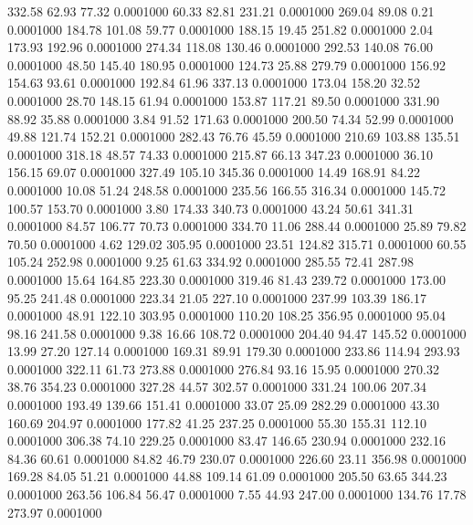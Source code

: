  332.58   62.93   77.32   0.0001000
  60.33   82.81  231.21   0.0001000
 269.04   89.08    0.21   0.0001000
 184.78  101.08   59.77   0.0001000
 188.15   19.45  251.82   0.0001000
   2.04  173.93  192.96   0.0001000
 274.34  118.08  130.46   0.0001000
 292.53  140.08   76.00   0.0001000
  48.50  145.40  180.95   0.0001000
 124.73   25.88  279.79   0.0001000
 156.92  154.63   93.61   0.0001000
 192.84   61.96  337.13   0.0001000
 173.04  158.20   32.52   0.0001000
  28.70  148.15   61.94   0.0001000
 153.87  117.21   89.50   0.0001000
 331.90   88.92   35.88   0.0001000
   3.84   91.52  171.63   0.0001000
 200.50   74.34   52.99   0.0001000
  49.88  121.74  152.21   0.0001000
 282.43   76.76   45.59   0.0001000
 210.69  103.88  135.51   0.0001000
 318.18   48.57   74.33   0.0001000
 215.87   66.13  347.23   0.0001000
  36.10  156.15   69.07   0.0001000
 327.49  105.10  345.36   0.0001000
  14.49  168.91   84.22   0.0001000
  10.08   51.24  248.58   0.0001000
 235.56  166.55  316.34   0.0001000
 145.72  100.57  153.70   0.0001000
   3.80  174.33  340.73   0.0001000
  43.24   50.61  341.31   0.0001000
  84.57  106.77   70.73   0.0001000
 334.70   11.06  288.44   0.0001000
  25.89   79.82   70.50   0.0001000
   4.62  129.02  305.95   0.0001000
  23.51  124.82  315.71   0.0001000
  60.55  105.24  252.98   0.0001000
   9.25   61.63  334.92   0.0001000
 285.55   72.41  287.98   0.0001000
  15.64  164.85  223.30   0.0001000
 319.46   81.43  239.72   0.0001000
 173.00   95.25  241.48   0.0001000
 223.34   21.05  227.10   0.0001000
 237.99  103.39  186.17   0.0001000
  48.91  122.10  303.95   0.0001000
 110.20  108.25  356.95   0.0001000
  95.04   98.16  241.58   0.0001000
   9.38   16.66  108.72   0.0001000
 204.40   94.47  145.52   0.0001000
  13.99   27.20  127.14   0.0001000
 169.31   89.91  179.30   0.0001000
 233.86  114.94  293.93   0.0001000
 322.11   61.73  273.88   0.0001000
 276.84   93.16   15.95   0.0001000
 270.32   38.76  354.23   0.0001000
 327.28   44.57  302.57   0.0001000
 331.24  100.06  207.34   0.0001000
 193.49  139.66  151.41   0.0001000
  33.07   25.09  282.29   0.0001000
  43.30  160.69  204.97   0.0001000
 177.82   41.25  237.25   0.0001000
  55.30  155.31  112.10   0.0001000
 306.38   74.10  229.25   0.0001000
  83.47  146.65  230.94   0.0001000
 232.16   84.36   60.61   0.0001000
  84.82   46.79  230.07   0.0001000
 226.60   23.11  356.98   0.0001000
 169.28   84.05   51.21   0.0001000
  44.88  109.14   61.09   0.0001000
 205.50   63.65  344.23   0.0001000
 263.56  106.84   56.47   0.0001000
   7.55   44.93  247.00   0.0001000
 134.76   17.78  273.97   0.0001000
